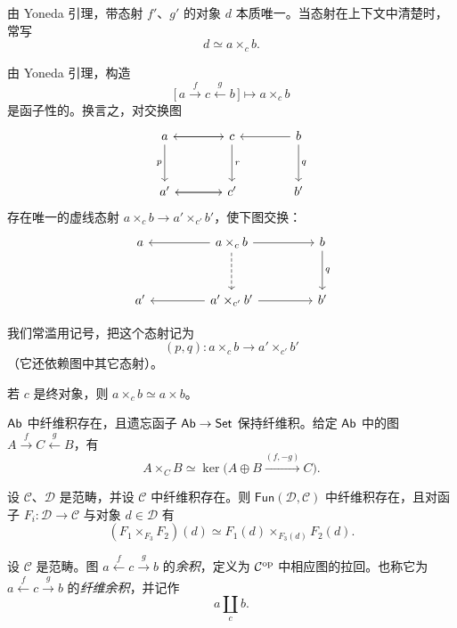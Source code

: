 \begin{remark}\label{rem:9.1.2}
由 Yoneda 引理，带态射 $f'$、$g'$ 的对象 $d$ 本质唯一。当态射在上下文中清楚时，常写
\[
d \simeq a \times_c b .
\]
\end{remark}

\begin{remark}\label{rem:9.1.3}
由 Yoneda 引理，构造
\[
\bigl[\,a \xrightarrow{f} c \xleftarrow{g} b\,\bigr] \longmapsto a \times_c b
\]
是函子性的。换言之，对交换图
\[
\begin{tikzcd}[column sep=3.8em,row sep=3em]
a \arrow[r] \arrow[d,"p"'] & c \arrow[l] \arrow[d,"r"] & b \arrow[l] \arrow[d,"q"]\\
a' \arrow[r] & c' \arrow[l] & b'
\end{tikzcd}
\]
存在唯一的虚线态射 $a \times_c b \to a' \times_{c'} b'$，使下图交换：
\[
\begin{tikzcd}[column sep=4.4em,row sep=3em]
a & a \times_c b \arrow[l] \arrow[r] \arrow[d,dashed] & b \arrow[d,"q"]\\
a' & a' \times_{c'} b' \arrow[l] \arrow[r] & b'
\end{tikzcd}
\]
\end{remark}

我们常滥用记号，把这个态射记为
\[
(p,q) \colon a \times_c b \to a' \times_{c'} b'
\]
（它还依赖图中其它态射）。

\begin{example}\label{ex:9.1.4}
若 $c$ 是终对象，则 $a \times_c b \simeq a \times b$。
\end{example}

\begin{example}\label{ex:9.1.5}
$\mathsf{Ab}$ 中纤维积存在，且遗忘函子 $\mathsf{Ab} \to \mathsf{Set}$ 保持纤维积。给定 $\mathsf{Ab}$ 中的图 $A \xrightarrow{f} C \xleftarrow{g} B$，有
\[
A \times_C B \simeq \ker\bigl(A \oplus B \xrightarrow{(f,-g)} C\bigr).
\]
\end{example}

\begin{example}\label{ex:9.1.6}
设 $\mathcal C$、$\mathcal D$ 是范畴，并设 $\mathcal C$ 中纤维积存在。则 $\mathsf{Fun}(\mathcal D,\mathcal C)$ 中纤维积存在，且对函子 $F_i \colon \mathcal D \to \mathcal C$ 与对象 $d \in \mathcal D$ 有
\[
(F_1 \times_{F_3} F_2)(d) \simeq F_1(d) \times_{F_3(d)} F_2(d).
\]
\end{example}

\begin{definition}\label{def:9.1.7}
设 $\mathcal C$ 是范畴。图 $a \xleftarrow{f} c \xrightarrow{g} b$ 的\emph{余积}，定义为 $\mathcal C^{\mathrm{op}}$ 中相应图的拉回。也称它为 $a \xleftarrow{f} c \xrightarrow{g} b$ 的\emph{纤维余积}，并记作
\[
a \coprod_c b .
\]
\end{definition}

